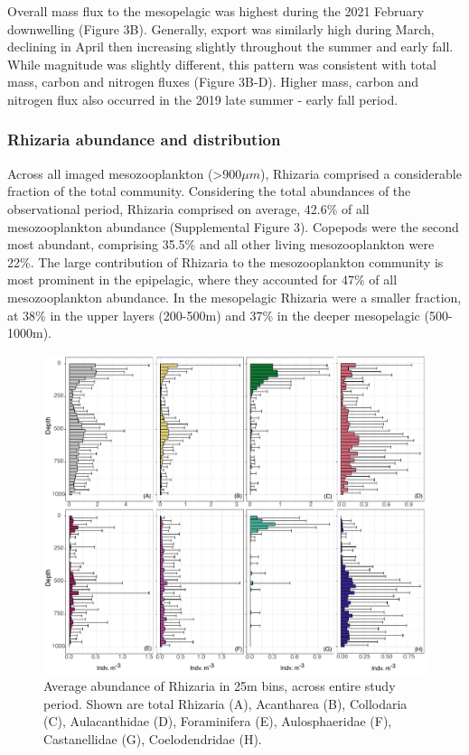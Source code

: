 \documentclass[
]{article}
\begin{document}
Overall mass flux to the mesopelagic was highest during the 2021
February downwelling (Figure 3B). Generally, export was similarly high
during March, declining in April then increasing slightly throughout the
summer and early fall. While magnitude was slightly different, this
pattern was consistent with total mass, carbon and nitrogen fluxes
(Figure 3B-D). Higher mass, carbon and nitrogen flux also occurred in
the 2019 late summer - early fall period.

\hypertarget{rhizaria-abundance-and-distribution}{%
\subsubsection{Rhizaria abundance and
distribution}\label{rhizaria-abundance-and-distribution}}

Across all imaged mesozooplankton (\textgreater900\(\mu m\)), Rhizaria
comprised a considerable fraction of the total community. Considering
the total abundances of the observational period, Rhizaria comprised on
average, 42.6\% of all mesozooplankton abundance (Supplemental Figure
3). Copepods were the second most abundant, comprising 35.5\% and all
other living mesozooplankton were 22\%. The large contribution of
Rhizaria to the mesozooplankton community is most prominent in the
epipelagic, where they accounted for 47\% of all mesozooplankton
abundance. In the mesopelagic Rhizaria were a smaller fraction, at 38\%
in the upper layers (200-500m) and 37\% in the deeper mesopelagic
(500-1000m).

\begin{figure}

{\centering \includegraphics{images/04_vertical.pdf}

}

\caption{Average abundance of Rhizaria in 25m bins, across entire study
period. Shown are total Rhizaria (A), Acantharea (B), Collodaria (C),
Aulacanthidae (D), Foraminifera (E), Aulosphaeridae (F), Castanellidae
(G), Coelodendridae (H).}

\end{figure}
\end{document}

